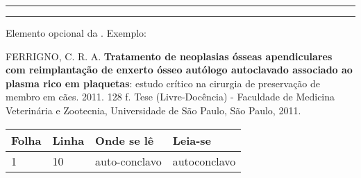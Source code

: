 
\imprimircapa

\imprimirfolhaderosto*


%
%     
\begin{fichacatalografica}%
	\vspace*{\fill}					%
	\hrule							%
	\begin{center}					%
	\begin{minipage}[c]{12.5cm}		%
	\FichaCatalografica
	
	\end{minipage}
	\end{center}
	\hrule
\end{fichacatalografica}

\begin{errata}%
Elemento opcional da . Exemplo:

\vspace{\onelineskip}

FERRIGNO, C. R. A. \textbf{Tratamento de neoplasias ósseas apendiculares com
reimplantação de enxerto ósseo autólogo autoclavado associado ao plasma
rico em plaquetas}: estudo crítico na cirurgia de preservação de membro em
cães. 2011. 128 f. Tese (Livre-Docência) - Faculdade de Medicina Veterinária e
Zootecnia, Universidade de São Paulo, São Paulo, 2011.

\begin{table}[htb]
\center
\footnotesize
\begin{tabular}{|p{1.4cm}|p{1cm}|p{3cm}|p{3cm}|}
  \hline
   \textbf{Folha} & \textbf{Linha}  & \textbf{Onde se lê}  & \textbf{Leia-se}  \\
    \hline
    1 & 10 & auto-conclavo & autoconclavo\\
   \hline
\end{tabular}
\end{table}

\end{errata}

